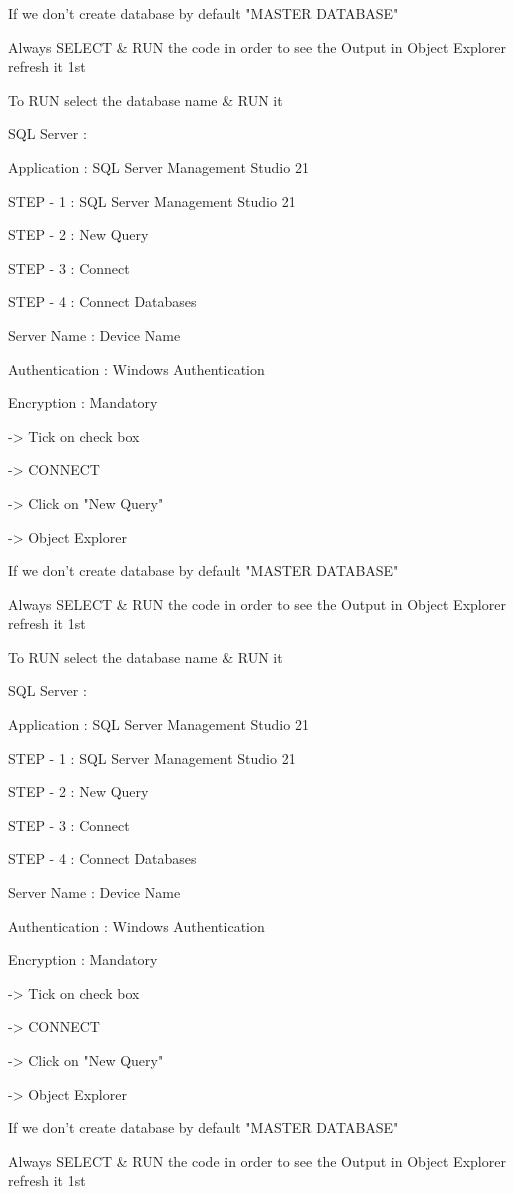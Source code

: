 If we don't create database by default "MASTER DATABASE"


Always SELECT & RUN the code in order to see the Output in Object Explorer refresh it 1st


To RUN select the database name & RUN it

SQL Server :

Application : SQL Server Management Studio 21

STEP - 1 : SQL Server Management Studio 21

STEP - 2 : New Query

STEP - 3 : Connect

STEP - 4 : Connect Databases


Server Name : Device Name

Authentication : Windows Authentication

Encryption : Mandatory

-> Tick on check box

-> CONNECT

-> Click on "New Query"

-> Object Explorer


If we don't create database by default "MASTER DATABASE"


Always SELECT & RUN the code in order to see the Output in Object Explorer refresh it 1st


To RUN select the database name & RUN it

SQL Server :

Application : SQL Server Management Studio 21

STEP - 1 : SQL Server Management Studio 21

STEP - 2 : New Query

STEP - 3 : Connect

STEP - 4 : Connect Databases


Server Name : Device Name

Authentication : Windows Authentication

Encryption : Mandatory

-> Tick on check box

-> CONNECT

-> Click on "New Query"

-> Object Explorer


If we don't create database by default "MASTER DATABASE"


Always SELECT & RUN the code in order to see the Output in Object Explorer refresh it 1st


